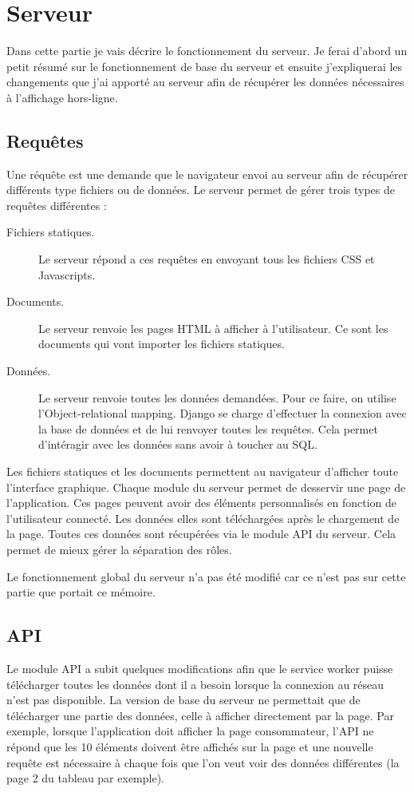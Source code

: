 \documentclass{EPL-master-thesis-covers-FR}
\begin{document}
		
		\section{Serveur}
		\label{sec:serveur}
			Dans cette partie je vais décrire le fonctionnement du serveur. Je ferai d'abord un petit résumé sur le fonctionnement de base du serveur et ensuite j'expliquerai les changements que j'ai apporté au serveur afin de récupérer les données nécessaires à l'affichage hors-ligne.
			
			\subsection*{Requêtes}
				Une réquête est une demande que le navigateur envoi au serveur afin de récupérer différents type fichiers ou de données. Le serveur permet de gérer trois types de requêtes différentes :
				
				\begin{description}
					\item[Fichiers statiques.] Le serveur répond a ces requêtes en envoyant tous les fichiers CSS et Javascripts.
					\item[Documents.] Le serveur renvoie les pages HTML à afficher à l'utilisateur. Ce sont les documents qui vont importer les fichiers statiques.
					\item[Données.] Le serveur renvoie toutes les données demandées. Pour ce faire, on utilise l'Object-relational mapping. Django se charge d'effectuer la connexion avec la base de données et de lui renvoyer toutes les requêtes. Cela permet d'intéragir avec les données sans avoir à toucher au SQL.
				\end{description}

				Les fichiers statiques et les documents permettent au navigateur d'afficher toute l'interface graphique. Chaque module du serveur permet de desservir une page de l'application. Ces pages peuvent avoir des éléments personnalisés en fonction de l'utilisateur connecté. Les données elles sont téléchargées après le chargement de la page. Toutes ces données sont récupérées via le module API du serveur. Cela permet de mieux gérer la séparation des rôles. 		
				
				Le fonctionnement global du serveur n'a pas été modifié car ce n'est pas sur cette partie que portait ce mémoire.
				
			\subsection*{API}
				\label{sec:api}
				Le module API a subit quelques modifications afin que le service worker puisse télécharger toutes les données dont il a besoin lorsque la connexion au réseau n'est pas disponible. La version de base du serveur ne permettait que de télécharger une partie des données, celle à afficher directement par la page. Par exemple, lorsque l'application doit afficher la page consommateur, l'API ne répond que les 10 éléments doivent être affichés sur la page et une nouvelle requête est nécessaire à chaque fois que l'on veut voir des données différentes (la page 2 du tableau par exemple).
				
\end{document}
